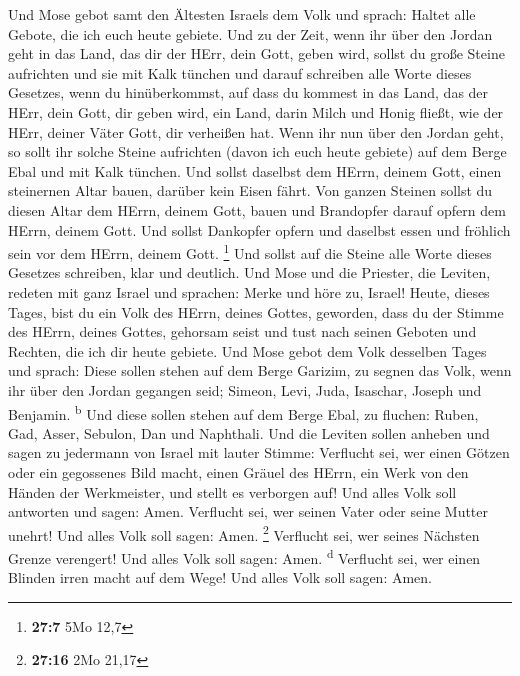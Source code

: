 Und Mose gebot samt den Ältesten Israels dem Volk und
sprach: Haltet alle Gebote, die ich euch heute gebiete. 
Und zu der Zeit, wenn ihr über den Jordan geht in das Land, das dir der
HErr, dein Gott, geben wird, sollst du große Steine aufrichten und sie
mit Kalk tünchen  und darauf schreiben alle Worte dieses
Gesetzes, wenn du hinüberkommst, auf dass du kommest in das Land, das
der HErr, dein Gott, dir geben wird, ein Land, darin Milch und Honig
fließt, wie der HErr, deiner Väter Gott, dir verheißen hat.
 Wenn ihr nun über den Jordan geht, so sollt ihr solche
Steine aufrichten (davon ich euch heute gebiete) auf dem Berge Ebal und
mit Kalk tünchen.  Und sollst daselbst dem HErrn, deinem
Gott, einen steinernen Altar bauen, darüber kein Eisen fährt.
 Von ganzen Steinen sollst du diesen Altar dem HErrn,
deinem Gott, bauen und Brandopfer darauf opfern dem HErrn, deinem Gott.
 Und sollst Dankopfer opfern und daselbst essen und
fröhlich sein vor dem HErrn, deinem Gott. \footnote{\textbf{27:7} 5Mo
  12,7}  Und sollst auf die Steine alle Worte dieses
Gesetzes schreiben, klar und deutlich.  Und Mose und die
Priester, die Leviten, redeten mit ganz Israel und sprachen: Merke und
höre zu, Israel! Heute, dieses Tages, bist du ein Volk des HErrn, deines
Gottes, geworden,  dass du der Stimme des HErrn, deines
Gottes, gehorsam seist und tust nach seinen Geboten und Rechten, die ich
dir heute gebiete.  Und Mose gebot dem Volk desselben
Tages und sprach:  Diese sollen stehen auf dem Berge
Garizim, zu segnen das Volk, wenn ihr über den Jordan gegangen seid;
Simeon, Levi, Juda, Isaschar, Joseph und Benjamin. \textsuperscript{b}
 Und diese sollen stehen auf dem Berge Ebal, zu fluchen:
Ruben, Gad, Asser, Sebulon, Dan und Naphthali.  Und die
Leviten sollen anheben und sagen zu jedermann von Israel mit lauter
Stimme:  Verflucht sei, wer einen Götzen oder ein
gegossenes Bild macht, einen Gräuel des HErrn, ein Werk von den Händen
der Werkmeister, und stellt es verborgen auf! Und alles Volk soll
antworten und sagen: Amen.  Verflucht sei, wer seinen
Vater oder seine Mutter unehrt! Und alles Volk soll sagen: Amen.
\footnote{\textbf{27:16} 2Mo 21,17}  Verflucht sei, wer
seines Nächsten Grenze verengert! Und alles Volk soll sagen: Amen.
\textsuperscript{d}  Verflucht sei, wer einen Blinden
irren macht auf dem Wege! Und alles Volk soll sagen: Amen.

